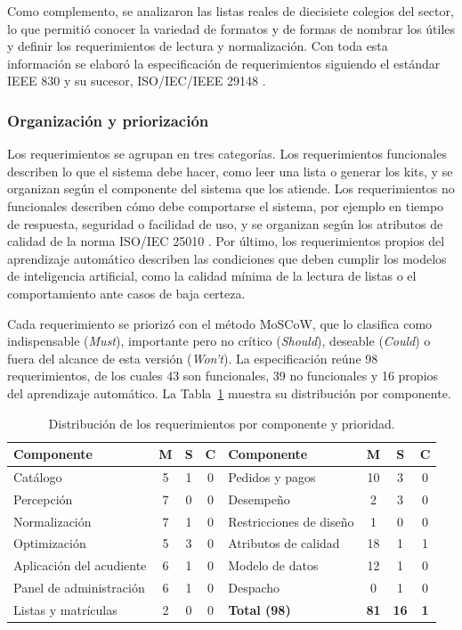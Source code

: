 Como complemento, se analizaron las listas reales de diecisiete colegios del sector, lo que
permitió conocer la variedad de formatos y de formas de nombrar los útiles y definir los
requerimientos de lectura y normalización. Con toda esta información se elaboró la
especificación de requerimientos siguiendo el estándar IEEE 830 y su sucesor, ISO/IEC/IEEE
29148 \citep{ieee_830_1998,iso_29148_2018}.\par
\subsubsection{Organización y priorización}

Los requerimientos se agrupan en tres categorías. Los requerimientos funcionales describen lo
que el sistema debe hacer, como leer una lista o generar los kits, y se organizan según el
componente del sistema que los atiende. Los requerimientos no funcionales describen cómo
debe comportarse el sistema, por ejemplo en tiempo de respuesta, seguridad o facilidad de
uso, y se organizan según los atributos de calidad de la norma ISO/IEC 25010
\citep{iso_25010_2011}. Por último, los requerimientos propios del aprendizaje automático
describen las condiciones que deben cumplir los modelos de inteligencia artificial, como la
calidad mínima de la lectura de listas o el comportamiento ante casos de baja certeza.\par

Cada requerimiento se priorizó con el método MoSCoW, que lo clasifica como indispensable
(\emph{Must}), importante pero no crítico (\emph{Should}), deseable (\emph{Could}) o fuera
del alcance de esta versión (\emph{Won't}). La especificación reúne 98 requerimientos, de los
cuales 43 son funcionales, 39 no funcionales y 16 propios del aprendizaje automático. La
Tabla~\ref{tab:moscow} muestra su distribución por componente.\par

\begin{table}[H]
\centering\footnotesize
\setlength{\tabcolsep}{4pt}
\renewcommand{\arraystretch}{1.15}
\caption{Distribución de los requerimientos por componente y prioridad.}
\label{tab:moscow}
\begin{tabular}{@{}lccclccc@{}}
\toprule
\textbf{Componente} & \textbf{M} & \textbf{S} & \textbf{C} &
\textbf{Componente} & \textbf{M} & \textbf{S} & \textbf{C} \\
\midrule
Catálogo & 5 & 1 & 0 & Pedidos y pagos & 10 & 3 & 0 \\
Percepción & 7 & 0 & 0 & Desempeño & 2 & 3 & 0 \\
Normalización & 7 & 1 & 0 & Restricciones de diseño & 1 & 0 & 0 \\
Optimización & 5 & 3 & 0 & Atributos de calidad & 18 & 1 & 1 \\
Aplicación del acudiente & 6 & 1 & 0 & Modelo de datos & 12 & 1 & 0 \\
Panel de administración & 6 & 1 & 0 & Despacho & 0 & 1 & 0 \\
Listas y matrículas & 2 & 0 & 0 & \textbf{Total (98)} & \textbf{81} & \textbf{16} &
\textbf{1} \\
\bottomrule
\end{tabular}
\end{table}


